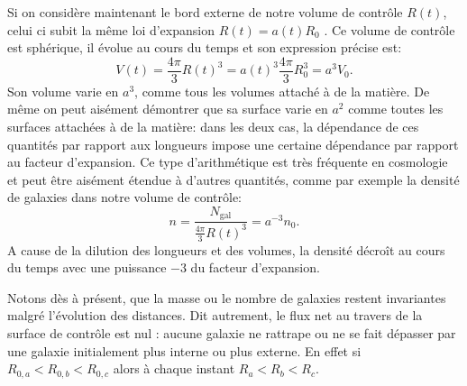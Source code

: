 Si on considère maintenant le bord externe de notre volume de contrôle $R(t)$, celui ci subit la même loi d'expansion $R(t)=a(t)R_0$ . Ce volume de contrôle est sphérique, il évolue au cours du temps et son expression précise est:
\begin{equation}
V(t)=\frac{4\pi}{3} R(t)^3 = a(t)^3\frac{4\pi}{3} R_0^3= a^3 V_0.
\end{equation}
Son volume varie en $a^3$, comme tous les volumes attaché à de la matière. De même on peut aisément démontrer que sa surface varie en $a^2$ comme toutes les surfaces attachées à de la matière: dans les deux cas, la dépendance de ces quantités par rapport aux longueurs impose une certaine dépendance par rapport au facteur d'expansion. Ce type d'arithmétique est très fréquente en cosmologie et peut être aisément étendue à d'autres quantités, comme par exemple la densité de galaxies dans notre volume de contrôle:
\begin{equation}
n=\frac{N_\mathrm{gal}}{\frac{4\pi}{3} R(t)^3}=a^{-3} n_0.
\end{equation}
A cause de la dilution des longueurs et des volumes, la densité décroît au cours du temps avec une puissance $-3$ du facteur d'expansion. 

Notons dès à présent, que la masse ou le nombre de galaxies restent invariantes malgré l'évolution des distances. Dit autrement, le flux net au travers de la surface de contrôle est nul : aucune galaxie ne rattrape ou ne se fait dépasser par une galaxie initialement plus interne ou plus externe. En effet si $R_{0,a}<R_{0,b}<R_{0,c}$ alors à chaque instant $R_a<R_b<R_c$.

